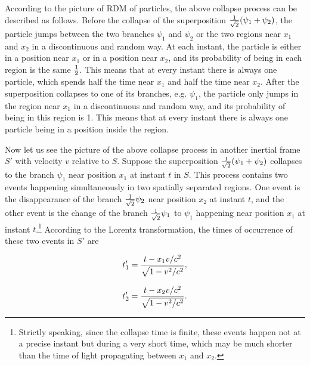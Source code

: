 According to the picture of RDM of particles, the above collapse process can be described as follows. Before the collapse of the superposition ${1 \over \sqrt{2}}(\psi_1+\psi_2)$, the particle jumps between the two branches $\psi_1$ and  $\psi_2$ or the two regions near $x_1$ and $x_2$ in a discontinuous and random way. At each instant, the particle is either in a position near $x_1$ or in a position near $x_2$, and its probability of being in each region is the same $1 \over 2$. This means that at every instant there is always one particle, which spends half the time near $x_1$ and half the time near $x_2$.  After the superposition collapses to one of its branches, e.g. $\psi_1$, the particle only jumps in the region near $x_1$ in a discontinuous and random way, and its probability of being in this region is 1. This means that at every instant there is always one particle being in a position inside the region. 

Now let us see the picture of the above collapse process in another inertial frame $S'$ with velocity $v$ relative to $S$.  Suppose the superposition ${1 \over \sqrt{2}}(\psi_1+\psi_2)$ collapses to the branch $\psi_1$ near position $x_1$ at instant $t$ in $S$. This process contains two events happening simultaneously in two spatially separated regions. One event is the disappearance of the branch ${1 \over \sqrt{2}}\psi_2$ near position $x_2$ at instant $t$, and the other event is the change of the branch ${1 \over \sqrt{2}}\psi_1$ to $\psi_1$ happening near position $x_1$ at instant $t$.\footnote{Strictly speaking, since the collapse time is  finite, these events happen not at a precise instant but during a very short time, which may be much shorter than the time of light propagating between $x_1$ and $x_2$.} According to the Lorentz transformation, the times of occurrence of these two events in $S'$ are

\begin{equation}
t'_1={{t-x_1v/c^2} \over \sqrt{1-v^2/c^2} },
\label{}
\end{equation}

\begin{equation}
t'_2={{t-x_2v/c^2} \over \sqrt{1-v^2/c^2} }.
\label{}
\end{equation}

